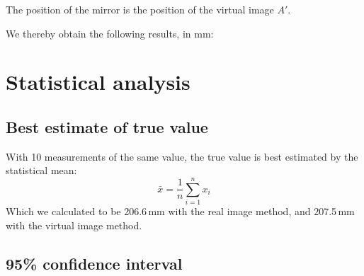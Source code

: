 \documentclass[a4paper,11pt]{article}
\begin{document}
The position of the mirror is the position of the virtual image $A'$.

We thereby obtain the following results, in mm:

\begin{table}[h]
  \centering
  \caption{Virtual image measurement data (distances in mm).}
\end{table}

\section{Statistical analysis}

\subsection{Best estimate of true value}

With 10 measurements of the same value, the true value is best estimated by the statistical mean:
\[
  \bar{x} = \frac{1}{n}\sum_{i=1}^{n} x_i
\]
Which we calculated to be 206.6\,mm with the real image method, and 207.5\,mm with the virtual image method.

\subsection{95\% confidence interval}
\end{document}
